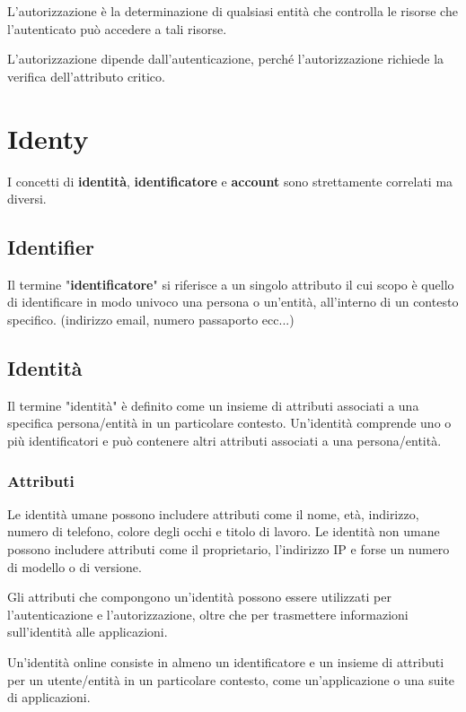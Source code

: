 L'autorizzazione è la determinazione di qualsiasi entità che controlla le risorse che l'autenticato può accedere a tali risorse.

L'autorizzazione dipende dall'autenticazione, perché l'autorizzazione richiede la verifica dell'attributo critico.


\section{Identy}

I concetti di \textbf{identità}, \textbf{identificatore} e \textbf{account} sono strettamente correlati ma diversi.

\subsection{Identifier}

Il termine "\textbf{identificatore}" si riferisce a un singolo attributo il cui scopo è quello di identificare in modo univoco una persona o un'entità, all'interno di un contesto specifico. (indirizzo email, numero passaporto ecc...)

\subsection{Identità}

Il termine "identità" è definito come un insieme di attributi associati a una specifica persona/entità in un particolare contesto. Un'identità comprende uno o più identificatori e può contenere altri attributi associati a una persona/entità.

\subsubsection{Attributi}
Le identità umane possono includere attributi come il nome, età, indirizzo, numero di telefono, colore degli occhi e titolo di lavoro.
Le identità non umane possono includere attributi come il proprietario, l'indirizzo IP e forse un numero di modello o di versione. 

Gli attributi che compongono un'identità possono essere utilizzati per l'autenticazione e l'autorizzazione, oltre che per trasmettere informazioni sull'identità alle applicazioni.

Un'identità online consiste in almeno un identificatore e un insieme di attributi per un utente/entità in un particolare contesto, come un'applicazione o una suite di applicazioni. 

